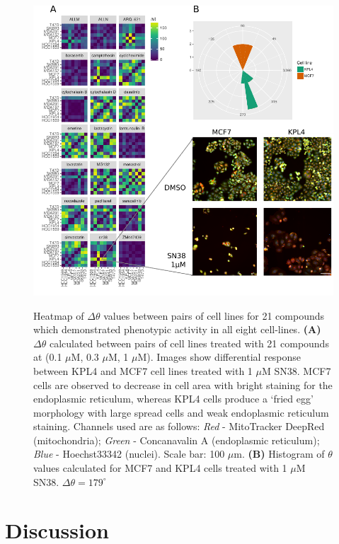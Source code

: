 \documentclass[a4paper,11pt,twoside,openright]{scrbook}
\begin{document}
\begin{figure}
    \captionsetup{width=0.8\textwidth}
    \caption[Heatmap of $\Delta\theta$ between pairs of cell lines for separate compounds]{
Heatmap of $\Delta\theta$ values between pairs of cell lines for 21 compounds which demonstrated phenotypic activity in 
all eight cell-lines.
\textbf{(A)} $\Delta\theta$ calculated between pairs of cell lines treated with 21 compounds at (0.1 $\mu$M, 0.3 
$\mu$M, 1 $\mu$M).
Images show differential response between KPL4 and MCF7 cell lines treated with 1 $\mu$M SN38.
    MCF7 cells are observed to decrease in cell area with bright staining for the endoplasmic reticulum, whereas KPL4 
cells produce a `fried egg' morphology with large spread cells and weak endoplasmic reticulum staining. Channels used 
are as follows: \textit{Red} - MitoTracker DeepRed (mitochondria); \textit{Green} - Concanavalin A (endoplasmic 
reticulum); \textit{Blue} - Hoechst33342 (nuclei). Scale bar: 100 $\mu$m.
\textbf{(B)} Histogram of $\theta$ values calculated for MCF7 and KPL4 cells treated with 1 $\mu$M SN38. $\Delta\theta 
= 179^\circ$
}
    \includegraphics[scale=1.0]{figs/ch3theta24}
    \label{figure:theta_24}
\end{figure}



\section{Discussion}
\end{document}
